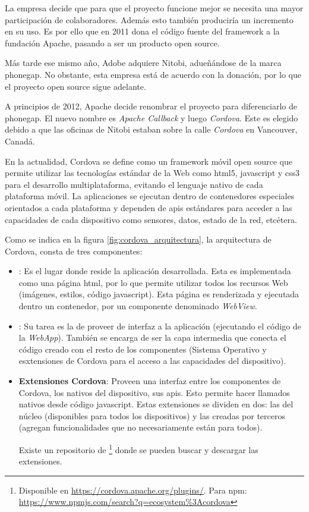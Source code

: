 La empresa decide que para que el proyecto funcione mejor se necesita una mayor participación de colaboradores. Además esto también produciría un incremento en su uso. Es por ello que en 2011 dona el código fuente del \gls{framework} a la fundación Apache, pasando a ser un producto \gls{open source}.

Más tarde ese mismo año, Adobe adquiere Nitobi, adueñándose de la marca \gls{phonegap}. No obstante, esta empresa está de acuerdo con la donación, por lo que el proyecto \gls{open source} sigue adelante.

A principios de 2012, Apache decide renombrar el proyecto para diferenciarlo de \gls{phonegap}. El nuevo nombre es \textit{Apache Callback} y luego \textit{Cordova}. Este es elegido debido a que las oficinas de Nitobi estaban sobre la calle \textit{Cordova} en Vancouver, Canadá.

En la actualidad, Cordova se define como un \gls{framework} móvil \gls{open source} que permite utilizar las tecnologías estándar de la Web como \gls{html}5, \gls{javascript} y \gls{css}3 para el desarrollo multiplataforma, evitando el lenguaje nativo de cada plataforma móvil. La aplicaciones se ejecutan dentro de contenedores especiales orientados a cada plataforma y dependen de \glspl{api} estándares para acceder a las capacidades de cada dispositivo como sensores, datos, estado de la red, etcétera.\cite{apache2017cordovaOverview}

Como se indica en la figura \ref{fig:cordova_arquitectura}, la arquitectura de Cordova, consta de tres componentes:
\begin{itemize}
\item \textbf{}: Es el lugar donde reside la aplicación desarrollada. Esta es implementada como una página \gls{html}, por lo que permite utilizar todos los recursos Web (imágenes, estilos, código \gls{javascript}). Esta página es renderizada y ejecutada dentro un contenedor, por un componente denominado \textit{WebView}.
\item \textbf{}: Su tarea es la de proveer de interfaz a la aplicación (ejecutando el código de la \textit{WebApp}). También se encarga de ser la capa intermedia que conecta el código creado con el resto de los componentes (Sistema Operativo y esxtensiones de Cordova para el acceso a las capacidades del dispositivo).
\item \textbf{Extensiones Cordova}: Proveen una interfaz entre los componentes de Cordova, los nativos del dispositivo, sus \glspl{api}. Esto permite hacer llamados nativos desde código \gls{javascript}. Estas extensiones se dividen en dos: las del núcleo (disponibles para todos los dispositivos) y las creadas por terceros (agregan funcionalidades que no necesariamente están para todos).

Existe un repositorio de \footnote{Disponible en \url{https://cordova.apache.org/plugins/}. Para npm:  \url{https://www.npmjs.com/search?q=ecosystem\%3Acordova}} donde se pueden buscar y descargar las extensiones.
\end{itemize}


